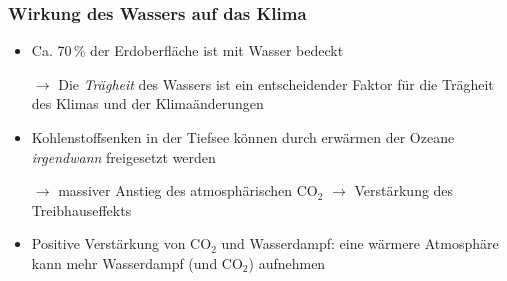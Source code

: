 \begin{frame}
	\frametitle{Wirkung des Wassers auf das Klima}
	\begin{itemize}
	\item Ca. 70\,\% der Erdoberfläche ist mit Wasser bedeckt
	\item [$\rightarrow$] Die \textit{Trägheit} des Wassers ist ein entscheidender Faktor für die Trägheit des Klimas und der Klimaänderungen %
	\item Kohlenstoffsenken in der Tiefsee können durch erwärmen der Ozeane \textit{irgendwann} freigesetzt werden
	\item[$\rightarrow$] massiver Anstieg des atmosphärischen CO$_2$ $\rightarrow$ Verstärkung des Treibhauseffekts
	\item Positive Verstärkung von CO$_2$ und Wasserdampf: eine wärmere Atmosphäre kann mehr Wasserdampf (und CO$_2$) aufnehmen
	\end{itemize}
\end{frame}

